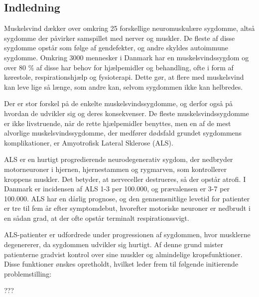 \subsection{Indledning}


Muskelsvind dækker over omkring 25 forskellige neuromuskulære sygdomme, altså sygdomme der påvirker samspillet med nerver og muskler. De fleste af disse sygdomme opstår som følge af gendefekter, og andre skyldes autoimmune sygdomme. Omkring 3000 mennesker i Danmark har en muskelsvindssygdom og over 80 \% af disse har behov for hjælpemidler og behandling, ofte i form af kørestole, respirationshjælp og fysioterapi. Dette gør, at flere med muskelsvind kan leve lige så længe, som andre kan, selvom sygdommen ikke kan helbredes. \citep{hvadermuskelsvind2016,sygdomsbeskrivelser2016}

Der er stor forskel på de enkelte muskelsvindssygdomme, og derfor også på hvordan de udvikler sig og deres konsekvenser. De fleste muskelsvindssygdomme er ikke livstruende, når de rette hjælpemidler benyttes, men en af de mest alvorlige muskelsvindssygdomme, der medfører dødsfald grundet sygdommens komplikationer, er Amyotrofisk Lateral Sklerose (ALS).  \citep{hvadermuskelsvind2016}

ALS er en hurtigt progredierende neurodegenerativ sygdom, der nedbryder motorneuroner i hjernen, hjernestammen og rygmarven, som kontrollerer kroppens muskler. Det betyder, at nerveceller destrueres, så der opstår atrofi. I Danmark er incidensen af ALS 1-3 per 100.000, og prævalensen er 3-7 per 100.000. ALS har en dårlig prognose, og den gennemsnitlige levetid for patienter er tre til fem år efter symptomdebut, hvorefter motoriske neuroner er nedbrudt i en sådan grad, at der ofte opstår terminalt respirationssvigt. \citep{russell2015, morris2015}

ALS-patienter er udfordrede under progressionen af sygdommen, hvor musklerne degenererer, da sygdommen udvikler sig hurtigt. Af denne grund mister patienterne gradvist kontrol over sine muskler og almindelige kropsfunktioner. Disse funktioner ønskes opretholdt, hvilket leder frem til følgende initierende problemstilling:

??? 
